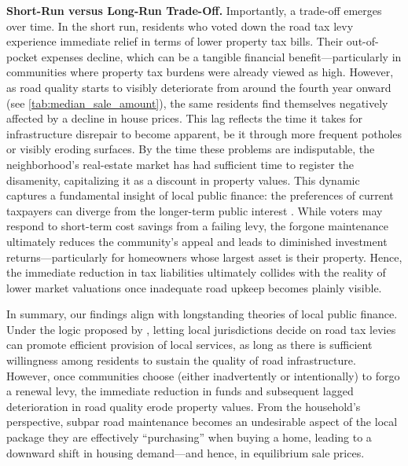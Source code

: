 {\bf Short-Run versus Long-Run Trade-Off.} Importantly, a trade-off emerges over time. In the short run, residents who voted down the road tax levy experience immediate relief in terms of lower property tax bills. Their out-of-pocket expenses decline, which can be a tangible financial benefit—particularly in communities where property tax burdens were already viewed as high. However, as road quality starts to visibly deteriorate from around the fourth year onward (see \ref{tab:median_sale_amount}), the same residents find themselves negatively affected by a decline in house prices. This lag reflects the time it takes for infrastructure disrepair to become apparent, be it through more frequent potholes or visibly eroding surfaces. By the time these problems are indisputable, the neighborhood’s real-estate market has had sufficient time to register the disamenity, capitalizing it as a discount in property values. This dynamic captures a fundamental insight of local public finance: the preferences of current taxpayers can diverge from the longer-term public interest \citep{BuchananTullock1962, AlesinaTabellini1990}. While voters may respond to short-term cost savings from a failing levy, the forgone maintenance ultimately reduces the community’s appeal and leads to diminished investment returns—particularly for homeowners whose largest asset is their property. Hence, the immediate reduction in tax liabilities ultimately collides with the reality of lower market valuations once inadequate road upkeep becomes plainly visible.


In summary, our findings align with longstanding theories of local public finance. Under the logic proposed by \cite{Oates1972}, letting local jurisdictions decide on road tax levies can promote efficient provision of local services, as long as there is sufficient willingness among residents to sustain the quality of road infrastructure. However, once communities choose (either inadvertently or intentionally) to forgo a renewal levy, the immediate reduction in funds and subsequent lagged deterioration in road quality erode property values. From the household’s perspective, subpar road maintenance becomes an undesirable aspect of the local package they are effectively “purchasing” when buying a home, leading to a downward shift in housing demand—and hence, in equilibrium sale prices.


